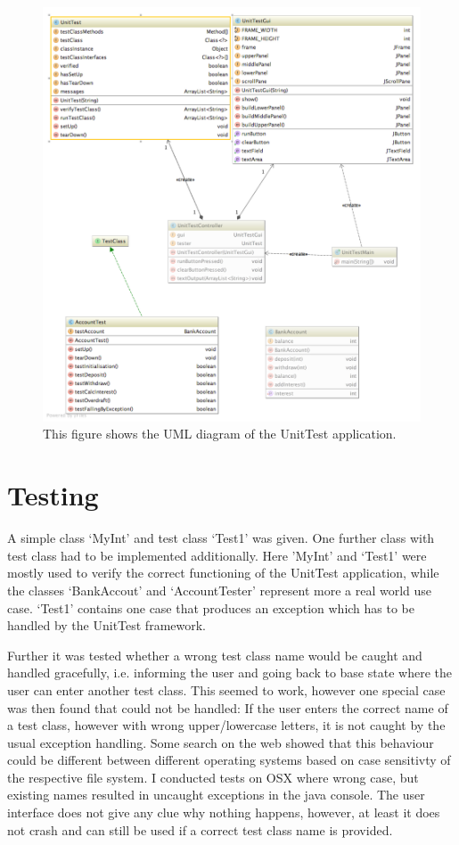 \documentclass[a4paper,11pt,twoside]{article}
\begin{document}
\begin{figure}[p]
    \centering
    \includegraphics[width=1.2\textwidth]{diagram.png}
    \caption{This figure shows the UML diagram of the UnitTest application.}
    \label{fig:diagram}
\end{figure}


\section{Testing}
A simple class `MyInt' and test class `Test1' was given. One further class with test class had to be implemented additionally. Here 'MyInt' and `Test1' were mostly used to verify the correct functioning of the UnitTest application, while the classes `BankAccout' and `AccountTester' represent more a real world use case. `Test1' contains one case that produces an exception which has to be handled by the UnitTest framework.

Further it was tested whether a wrong test class name would be caught and handled gracefully, i.e. informing the user and going back to base state where the user can enter another test class. This seemed to work, however one special case was then found that could not be handled: If the user enters the correct name of a test class, however with wrong upper/lowercase letters, it is not caught by the usual exception handling. Some search on the web showed that this behaviour could be different between different operating systems based on case sensitivty of the respective file system. I conducted tests on OSX where wrong case, but existing names resulted in uncaught exceptions in the java console. The user interface does not give any clue why nothing happens, however, at least it does not crash and can still be used if a correct test class name is provided. 



\end{document}
